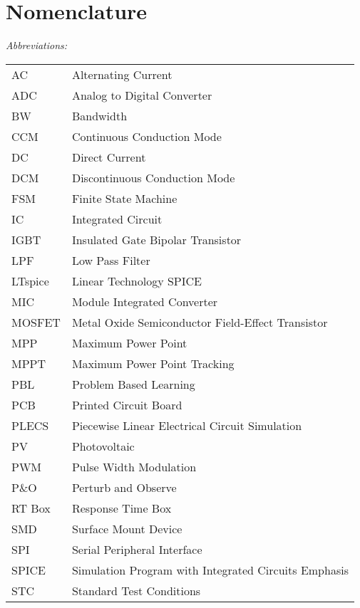 \chapter*{Nomenclature}


\vspace{-10mm} %
\textit{Abbreviations:}\newline
\begin{tabular}{ll} %
AC & Alternating Current\\
ADC & Analog to Digital Converter \\
BW & Bandwidth \\
CCM & Continuous Conduction Mode\\
DC & Direct Current\\
DCM & Discontinuous Conduction Mode\\
FSM & Finite State Machine \\
IC & Integrated Circuit\\
IGBT & Insulated Gate Bipolar Transistor \\
LPF & Low Pass Filter\\
LTspice & Linear Technology SPICE \\
MIC & Module Integrated Converter\\
MOSFET & Metal Oxide Semiconductor Field-Effect Transistor\\
MPP & Maximum Power Point\\
MPPT & Maximum Power Point Tracking\\
PBL & Problem Based Learning\\
PCB & Printed Circuit Board\\
PLECS & Piecewise Linear Electrical Circuit Simulation\\
PV & Photovoltaic\\
PWM & Pulse Width Modulation\\
P\&O & Perturb and Observe\\
RT Box & Response Time Box \\
SMD & Surface Mount Device \\
SPI & Serial Peripheral Interface\\
SPICE & Simulation Program with Integrated Circuits Emphasis \\
STC & Standard Test Conditions\\
\end{tabular}

